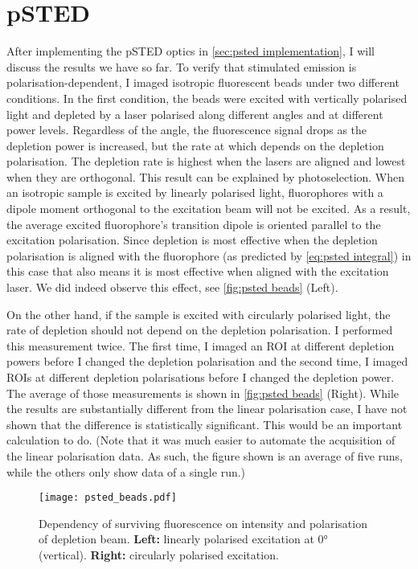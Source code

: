 \section{pSTED}

After implementing the pSTED optics in \autoref{sec:psted implementation}, I will discuss the results we have so far. To verify that stimulated emission is polarisation-dependent, I imaged isotropic fluorescent beads under two different conditions. In the first condition, the beads were excited with vertically polarised light and depleted by a laser polarised along different angles and at different power levels. Regardless of the angle, the fluorescence signal drops as the depletion power is increased, but the rate at which depends on the depletion polarisation. The depletion rate is highest when the lasers are aligned and lowest when they are orthogonal. This result can be explained by photoselection. When an isotropic sample is excited by linearly polarised light, fluorophores with a dipole moment orthogonal to the excitation beam will not be excited. As a result, the average excited fluorophore's transition dipole is oriented parallel to the excitation polarisation. Since depletion is most effective when the depletion polarisation is aligned with the fluorophore (as predicted by \autoref{eq:psted integral}) in this case that also means it is most effective when aligned with the excitation laser. We did indeed observe this effect, see \autoref{fig:psted beads} (Left). 

On the other hand, if the sample is excited with circularly polarised light, the rate of depletion should not depend on the depletion polarisation. I performed this measurement twice. The first time, I imaged an ROI at different depletion powers before I changed the depletion polarisation and the second time, I imaged ROIs at different depletion polarisations before I changed the depletion power. The average of those measurements is shown in \autoref{fig:psted beads} (Right). While the results are substantially different from the linear polarisation case, I have not shown that the difference is statistically significant. This would be an important calculation to do. (Note that it was much easier to automate the acquisition of the linear polarisation data. As such, the figure shown is an average of five runs, while the others only show data of a single run.)

\begin{figure}
	\centering
	\texttt{[image: psted\_beads.pdf]}
	\caption{
		Dependency of surviving fluorescence on intensity and polarisation of depletion beam. \textbf{Left:} linearly polarised excitation at 0° (vertical). \textbf{Right:} circularly polarised excitation.
	}
	\label{fig:psted beads}
\end{figure}

